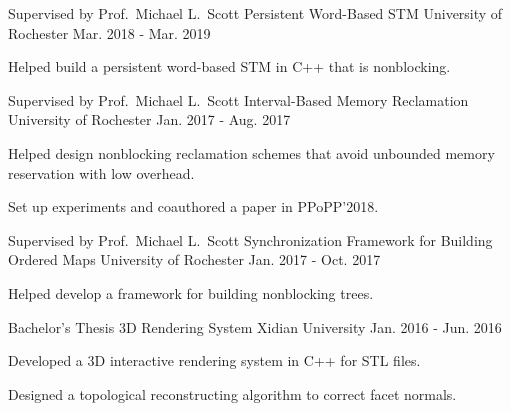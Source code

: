 \begin{cventries}
  \cventry
    {Supervised by Prof.\ Michael L.\ Scott} %
    {Persistent Word-Based STM} %
    {University of Rochester} %
    {Mar. 2018 - Mar. 2019} %
    {
      \begin{cvitems} %
        \item {Helped build a persistent word-based STM in C++ that is nonblocking.}
      \end{cvitems}
    }

  \cventry
    {Supervised by Prof.\ Michael L.\ Scott} %
    {Interval-Based Memory Reclamation} %
    {University of Rochester} %
    {Jan. 2017 - Aug. 2017} %
    {
      \begin{cvitems} %
        \item {Helped design nonblocking reclamation schemes that avoid unbounded memory reservation with low overhead.}
        \item {Set up experiments and coauthored a paper in PPoPP'2018.}
      \end{cvitems}
    }

  \cventry
    {Supervised by Prof.\ Michael L.\ Scott} %
    {Synchronization Framework for Building Ordered Maps} %
    {University of Rochester} %
    {Jan. 2017 - Oct. 2017} %
    {
      \begin{cvitems} %
        \item {Helped develop a framework for building nonblocking trees.}
      \end{cvitems}
    }

  \cventry
    {Bachelor's Thesis} %
    {3D Rendering System} %
    {Xidian University} %
    {Jan. 2016 - Jun. 2016} %
    {
      \begin{cvitems} %
        \item {Developed a 3D interactive rendering system in C++ for STL files.}
        \item {Designed a topological reconstructing algorithm to correct facet normals.}
      \end{cvitems}
    }
\end{cventries}
